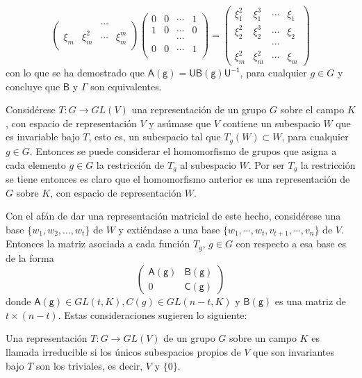 \begin{ejemplo}
\begin{equation*}
\begin{pmatrix}
 & & \cdots & \\
 \xi_m & \xi_m^2 & \cdots & \xi_m^m \\
\end{pmatrix}
\begin{pmatrix}
0 & 0 & \cdots & 1 \\
1 & 0 & \cdots & 0 \\
 & & \cdots & \\
0 & 0 & \cdots & 1 \\
\end{pmatrix} = \begin{pmatrix}
\xi_1^2 & \xi_1^3 & \cdots & \xi_1 \\
\xi_2^2 & \xi_2^3 & \cdots & \xi_2 \\
 & & \cdots & \\
\xi_m^2 & \xi_m^2 & \cdots & \xi_m
\end{pmatrix}
\end{equation*} con lo que se ha demostrado que $\mathsf{A(g)} = \mathsf{UB(g)U^{-1}}$, para cualquier $g \in G$ y concluye que $\mathsf{B}$ y $\mathsf{\Gamma}$ son equivalentes. 
\end{ejemplo}

Considérese $T \colon G \to GL(V)$ una representación de un grupo $G$ sobre el campo $K$, con espacio de representación $V$ y asúmase que $V$ contiene un subespacio $W$ que es invariable bajo $T$, esto es, un subespacio tal que $T_g(W) \subset W$, para cualquier $g \in G$. Entonces se puede considerar el homomorfismo de grupos que asigna a cada elemento $g \in G$ la restricción de $T_g$ al subespacio $W$. Por ser $T_g$ la restricción se tiene entonces es claro que el homomorfismo anterior es una representación de $G$ sobre $K$, con espacio de representación $W$.

Con el afán de dar una representación matricial de este hecho, considérese una base $\{ w_1, w_2, \dots, w_t \}$ de $W$ y extiéndase a una base $ \{ w_1, \cdots, w_t, v_{t+1}, \cdots, v_n \}$ de $V$. Entonces la matriz asociada a cada función $T_g$, $g \in G$ con respecto a esa base es de la forma
\begin{equation*} \begin{pmatrix}
\mathsf{A(g)} & \mathsf{B(g)} \\
0 & \mathsf{C(g)}
\end{pmatrix} \end{equation*} donde $\mathsf{A(g)} \in GL(t,K), C(g) \in GL(n-t,K)$ y $\mathsf{B(g)}$ es una matriz de $t \times (n-t)$. Estas consideraciones sugieren lo siguiente:
\begin{definicion}
Una representación $T \colon G \to GL(V)$ de un grupo $G$ sobre un campo $K$ es llamada irreducible si los únicos subespacios propios de $V$ que son invariantes bajo $T$ son los triviales, es decir, $V$ y $\{ 0 \}$.
\end{definicion}

